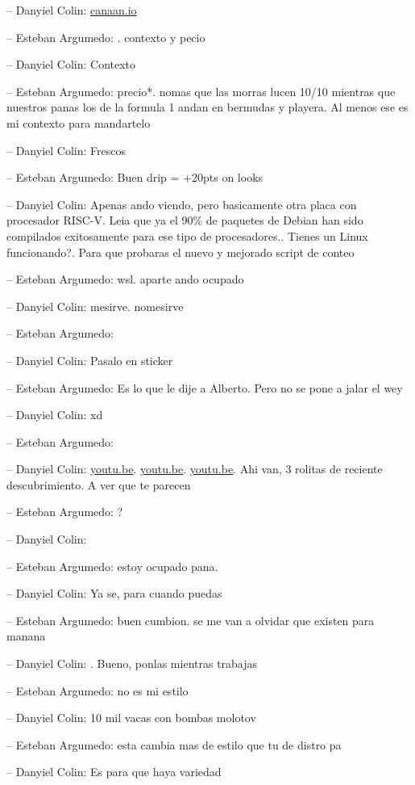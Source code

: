 -- Danyiel Colin:
\href{https://canaan.io/product/kendryte-k510-crb-kit-developer-kit}{canaan.io}

-- Esteban Argumedo: . contexto y pecio

-- Danyiel Colin: Contexto

-- Esteban Argumedo: precio*. nomas que las morras lucen 10/10 mientras
que nuestros panas los de la formula 1 andan en bermudas y playera. Al
menos ese es mi contexto para mandartelo

-- Danyiel Colin: Frescos

-- Esteban Argumedo: Buen drip = +20pts on looks

-- Danyiel Colin: Apenas ando viendo, pero basicamente otra placa con
procesador RISC-V. Leia que ya el 90\% de paquetes de Debian han sido
compilados exitosamente para ese tipo de procesadores.. Tienes un Linux
funcionando?. Para que probaras el nuevo y mejorado script de conteo

-- Esteban Argumedo: wsl. aparte ando ocupado

-- Danyiel Colin: mesirve. nomesirve

-- Esteban Argumedo:

-- Danyiel Colin: Pasalo en sticker

-- Esteban Argumedo: Es lo que le dije a Alberto. Pero no se pone a
jalar el wey

-- Danyiel Colin: xd

-- Esteban Argumedo:

-- Danyiel Colin: \href{https://youtu.be/4n13zKCRk9E}{youtu.be}.
\href{https://youtu.be/KiRgK0WmJsk}{youtu.be}.
\href{https://youtu.be/4GPM8Mn1esQ}{youtu.be}. Ahi van, 3 rolitas de
reciente descubrimiento. A ver que te parecen

-- Esteban Argumedo: ?

-- Danyiel Colin:

-- Esteban Argumedo: estoy ocupado pana.

-- Danyiel Colin: Ya se, para cuando puedas

-- Esteban Argumedo: buen cumbion. se me van a olvidar que existen para
manana

-- Danyiel Colin: . Bueno, ponlas mientras trabajas

-- Esteban Argumedo: no es mi estilo

-- Danyiel Colin: 10 mil vacas con bombas molotov

-- Esteban Argumedo: esta cambia mas de estilo que tu de distro pa

-- Danyiel Colin: Es para que haya variedad

